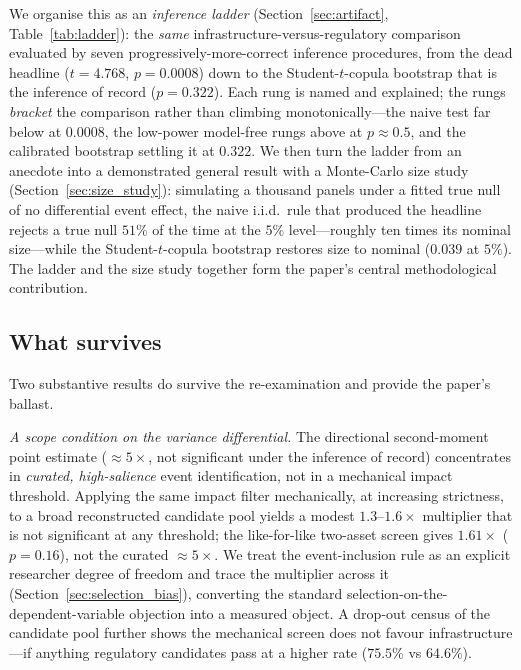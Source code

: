 \documentclass[pdflatex,sn-mathphys-num]{sn-jnl}
\theoremstyle{thmstyleone}
\theoremstyle{thmstyletwo}
\theoremstyle{thmstylethree}
\begin{document}
We organise this as an \emph{inference ladder} (Section~\ref{sec:artifact}, Table~\ref{tab:ladder}): the \emph{same} infrastructure-versus-regulatory comparison evaluated by seven progressively-more-correct inference procedures, from the dead headline ($t=4.768$, $p=0.0008$) down to the Student-$t$-copula bootstrap that is the inference of record ($p=0.322$). Each rung is named and explained; the rungs \emph{bracket} the comparison rather than climbing monotonically---the naive test far below at $0.0008$, the low-power model-free rungs above at $p\approx 0.5$, and the calibrated bootstrap settling it at $0.322$. We then turn the ladder from an anecdote into a demonstrated general result with a Monte-Carlo size study (Section~\ref{sec:size_study}): simulating a thousand panels under a fitted true null of no differential event effect, the naive i.i.d.\ rule that produced the headline rejects a true null $51\%$ of the time at the $5\%$ level---roughly ten times its nominal size---while the Student-$t$-copula bootstrap restores size to nominal ($0.039$ at $5\%$). The ladder and the size study together form the paper's central methodological contribution.

\subsection{What survives}

Two substantive results do survive the re-examination and provide the paper's ballast.

\emph{A scope condition on the variance differential.} The directional second-moment point estimate ($\approx 5\times$, not significant under the inference of record) concentrates in \emph{curated, high-salience} event identification, not in a mechanical impact threshold. Applying the same impact filter mechanically, at increasing strictness, to a broad reconstructed candidate pool yields a modest $1.3$--$1.6\times$ multiplier that is not significant at any threshold; the like-for-like two-asset screen gives $1.61\times$ ($p=0.16$), not the curated $\approx 5\times$. We treat the event-inclusion rule as an explicit researcher degree of freedom and trace the multiplier across it (Section~\ref{sec:selection_bias}), converting the standard selection-on-the-dependent-variable objection into a measured object. A drop-out census of the candidate pool further shows the mechanical screen does not favour infrastructure---if anything regulatory candidates pass at a higher rate ($75.5\%$ vs $64.6\%$).
\end{document}
